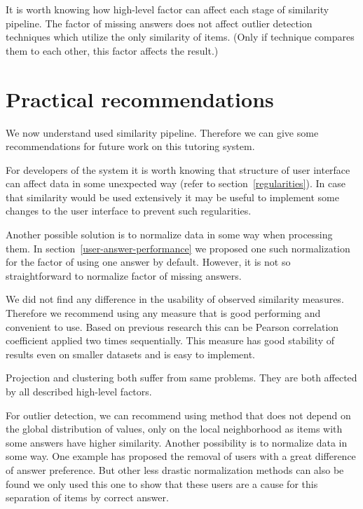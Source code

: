 \documentclass[
  print, %
  table,   %
  nolof,     %
  nolot,     %
  nocover,
  color,
  final,
]{fithesis3}
\begin{document}
It is worth knowing how high-level factor can affect each stage of similarity pipeline. The factor of missing answers does not affect outlier detection techniques which utilize the only similarity of items. (Only if technique compares them to each other, this factor affects the result.)


\section{Practical recommendations}\label{practical-recommendations}

We now understand used similarity pipeline. Therefore we can give some recommendations for future work on this tutoring system.


For developers of the system it is worth knowing that structure of user interface can affect data in some unexpected way (refer to section~\ref{regularities}). In case that similarity would be used extensively it may be useful to implement some changes to the user interface to prevent such regularities.


Another possible solution is to normalize data in some way when processing them. In section~\ref{user-answer-performance} we proposed one such normalization for the factor of using one answer by default. However, it is not so straightforward to normalize factor of missing answers.


We did not find any difference in the usability of observed similarity measures. Therefore we recommend using any measure that is good performing and convenient to use. Based on previous research this can be Pearson correlation coefficient applied two times sequentially. This measure has good stability of results even on smaller datasets and is easy to implement.


Projection and clustering both suffer from same problems. They are both affected by all described high-level factors.


For outlier detection, we can recommend using method that does not depend on the global distribution of values, only on the local neighborhood as items with some answers have higher similarity. Another possibility is to normalize data in some way. One example has proposed the removal of users with a great difference of answer preference. But other less drastic normalization methods can also be found we only used this one to show that these users are a cause for this separation of items by correct answer.
\end{document}
